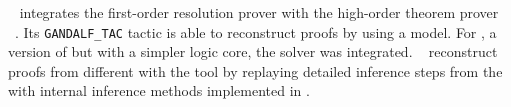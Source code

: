 \documentclass[../main.tex]{subfiles}
\begin{document}
\citeauthor{Hurd1999}~\cite{Hurd1999} integrates the first-order resolution
prover  with the high-order theorem prover
~\cite{norrish2017hol}.
Its \verb!GANDALF_TAC! tactic is able to reconstruct  proofs
by using a  model. For , a version of
 but with a simpler logic core, the \SMT solver 
was integrated. \citeauthor{kaliszyk2013}~\cite{kaliszyk2013}
reconstruct proofs from different \ATPs with the  tool by
replaying detailed inference steps from the \ATPs with internal
inference methods implemented in .
\end{document}
